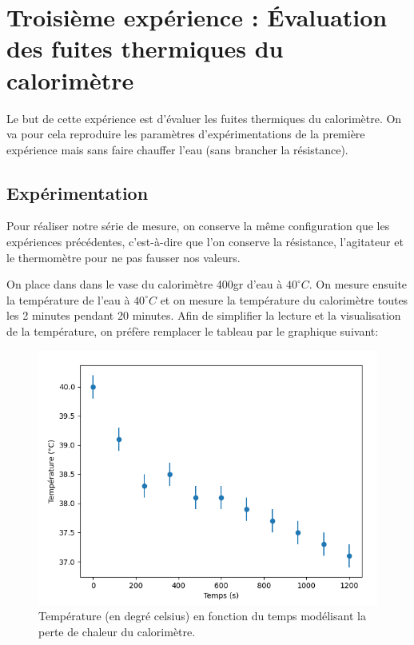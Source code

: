 \documentclass[12pt]{article}
\begin{document}
\newpage
\section{Troisième expérience : Évaluation des fuites thermiques du calorimètre}
Le but de cette expérience est d'évaluer les fuites thermiques du calorimètre. On va pour cela reproduire les paramètres d'expérimentations de la première expérience mais sans faire chauffer l'eau (sans brancher la résistance).
\subsection{Expérimentation}

Pour réaliser notre série de mesure, on conserve la même configuration que les expériences précédentes, c'est-à-dire
que l'on conserve la résistance, l'agitateur et le thermomètre pour ne pas fausser nos valeurs. 

On place dans dans le vase du calorimètre 400gr d'eau à $40^\circ C$. On mesure ensuite la température de l'eau à $40^\circ C$ et on mesure la température du calorimètre toutes les 2 minutes pendant 20 minutes.
Afin de simplifier la lecture et la visualisation de la température, on préfère remplacer le tableau par le graphique suivant:

\begin{figure}[h!]
	\begin{center}
		\includegraphics[scale=0.64]{img/Figure_2.png}
	\end{center}
	\label{fig:graph2}
	\caption{Température (en degré celsius) en fonction du temps modélisant la perte de chaleur du calorimètre.}
\end{figure}
\end{document}
